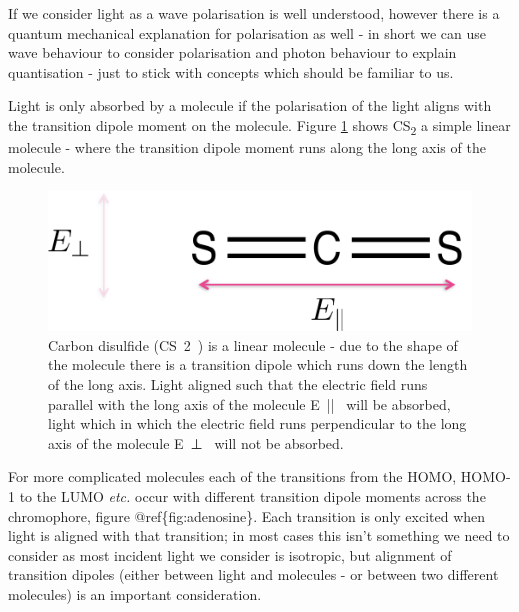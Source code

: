 \documentclass[
]{book}
\begin{document}
If we consider light as a wave polarisation is well understood, however there is a quantum mechanical explanation for polarisation as well - in short we can use wave behaviour to consider polarisation and photon behaviour to explain quantisation - just to stick with concepts which should be familiar to us.

Light is only absorbed by a molecule if the polarisation of the light aligns with the transition dipole moment on the molecule. Figure \ref{fig:CS2} shows CS\textsubscript{2} a simple linear molecule - where the transition dipole moment runs along the long axis of the molecule.

\begin{figure}

{\centering \includegraphics[width=0.6\linewidth]{images/CS2} 

}

\caption{Carbon disulfide (CS~2~) is a linear molecule -  due to the shape of the molecule there is a transition dipole which runs down the length of the long axis. Light aligned such that the electric field runs parallel with the long axis of the molecule E~||~ will be absorbed, light which in which the electric field runs perpendicular to the long axis of the molecule E~⊥~ will not be absorbed.}\label{fig:CS2}
\end{figure}

For more complicated molecules each of the transitions from the HOMO, HOMO-1 to the LUMO \emph{etc.} occur with different transition dipole moments across the chromophore, figure @ref\{fig:adenosine\}. Each transition is only excited when light is aligned with that transition; in most cases this isn't something we need to consider as most incident light we consider is isotropic, but alignment of transition dipoles (either between light and molecules - or between two different molecules) is an important consideration.
\end{document}
